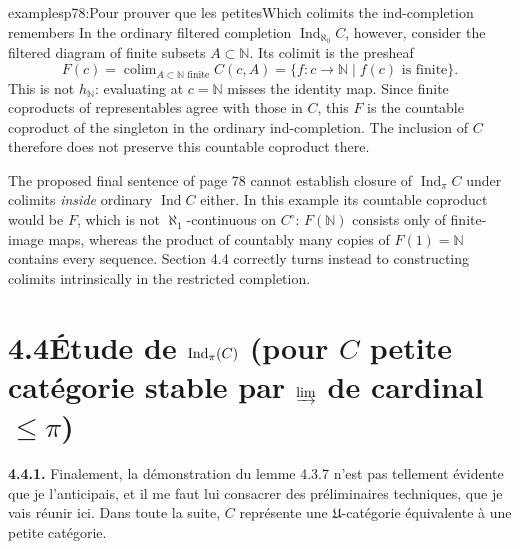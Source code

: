 \begin{dcomment}{examples}{p78:Pour prouver que les petites}{Which colimits the ind-completion remembers}
In the ordinary filtered completion $\operatorname{Ind}_{\aleph_0}C$, however, consider the filtered diagram of finite subsets $A\subset\mathbb N$.  Its colimit is the presheaf
\[
 F(c)=\operatorname{colim}_{A\subset\mathbb N\text{ finite}}C(c,A)
     =\{f:c\to\mathbb N\mid f(c)\text{ is finite}\}.
\]
This is not $h_{\mathbb N}$: evaluating at $c=\mathbb N$ misses the identity map.  Since finite coproducts of representables agree with those in $C$, this $F$ is the countable coproduct of the singleton in the ordinary ind-completion.  The inclusion of $C$ therefore does not preserve this countable coproduct there.

The proposed final sentence of page 78 cannot establish closure of $\operatorname{Ind}_\pi C$ under colimits \emph{inside} ordinary $\operatorname{Ind}C$ either.  In this example its countable coproduct would be $F$, which is not $\aleph_1$-continuous on $C^\circ$: $F(\mathbb N)$ consists only of finite-image maps, whereas the product of countably many copies of $F(1)=\mathbb N$ contains every sequence.  Section 4.4 correctly turns instead to constructing colimits intrinsically in the restricted completion.
\end{dcomment}



\section*{4.4\quad Étude de $\operatorname{Ind}_\pi(C)$ (pour $C$ petite catégorie stable par $\varinjlim$ de cardinal $\leqslant \pi$)}

\textbf{4.4.1.} Finalement, la démonstration du lemme 4.3.7 n'est pas tellement évidente que je l'anticipais, et il me faut lui consacrer des préliminaires techniques, que je vais réunir ici. Dans toute la suite, $C$ représente une $\mathfrak{U}$-catégorie équivalente à une petite catégorie.



